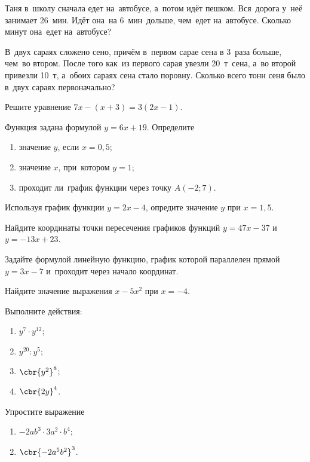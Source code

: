 Таня в~школу сначала едет на~автобусе, а~потом идёт пешком. Вся~дорога у~неё занимает 26~мин. Идёт она~на 6~мин~дольше,
чем~едет на~автобусе. Сколько минут она~едет на~автобусе?

В~двух сараях сложено сено, причём в~первом сарае сена в 3~раза больше, чем~во втором. 
После того как~из первого сарая увезли 20~т~сена, а~во второй привезли 10~т, 
а~обоих сараях сена стало поровну. Сколько всего тонн сеня было в~двух сараях первоначально?

Решите уравнение $7x - (x+3) = 3(2x - 1).$

Функция задана формулой $y = 6x + 19$. Определите
\begin{enumerate}
    \item значение $y$, если $x=0{,}5$;
    \item значение $x$, при~котором $y = 1$;
    \item проходит ли~график функции через точку $A(-2;7)$.
\end{enumerate}


Используя график функции $y=2x-4$, опредите значение $y$ при $x=1{,}5$.

Найдите координаты точки пересечения графиков функций $y = 47x - 37$ и $y=-13 x + 23$.

Задайте формулой линейную функцию, график которой параллелен прямой $y=3x-7$ и~проходит через начало координат.

Найдите значение выражения $x - 5x^2$ при $x = -4$.

Выполните действия:
\begin{enumerate}
    \item $y^7\cdot y^{12}$;
    \item $y^{20} : y^5$;
    \item $\cbr{y^{2}}^8$;
    \item $\cbr{2y}^4$.
\end{enumerate}

Упростите выражение
\begin{enumerate}
    \item $-2ab^3 \cdot 3a^2 \cdot b^4$;
    \item $\cbr{-2a^5b^2}^3$.
\end{enumerate}

